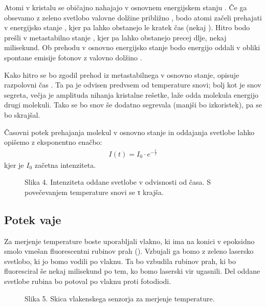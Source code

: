\documentclass[letterpaper,10pt,english]{sphinxmanual}
\begin{document}
\sphinxAtStartPar
Atomi v kristalu se običajno nahajajo v osnovnem energijskem stanju . Če ga obsevamo z zeleno svetlobo valovne dolžine približno , bodo atomi začeli prehajati v energijsko stanje , kjer pa lahko obstanejo le kratek čas (nekaj ). Hitro bodo prešli v metastabilno stanje , kjer pa lahko obstanejo precej dlje, nekaj milisekund. Ob prehodu v osnovno energijsko stanje  bodo energijo oddali v obliki spontane emisije \textendash{} fotonov z valovno dolžino .

\sphinxAtStartPar
Kako hitro se bo zgodil prehod iz metastabilnega v osnovno stanje, opisuje razpolovni čas . Ta pa je odvisen predvsem od temperature snovi; bolj kot je snov segreta, večja je amplituda nihanja kristalne rešetke, laže odda molekula energijo drugi molekuli. Tako se bo snov še dodatno segrevala (manjši bo izkoristek),  pa se bo skrajšal.

\sphinxAtStartPar
Časovni potek prehajanja molekul v osnovno stanje in oddajanja svetlobe lahko opišemo z eksponentno enačbo:
\begin{equation*}
\begin{split}I(t) = I_{0} \cdot  e ^ {- \frac{t}{τ}}\end{split}
\end{equation*}
\sphinxAtStartPar
kjer je \({I_{0}}\) začetna intenziteta.

\begin{figure}[htbp]
\centering
\capstart

\noindent{}
\caption{Slika 4. Intenziteta oddane svetlobe v odvisnosti od časa. S povečevanjem temperature snovi se τ krajša.}\label{\detokenize{vlakenski_senzorji:id5}}\end{figure}


\subsection{Potek vaje}
\label{\detokenize{vlakenski_senzorji:potek-vaje}}
\sphinxAtStartPar
Za merjenje temperature boste uporabljali vlakno, ki ima na konici v epoksidno smolo vmešan fluorescentni rubinov prah (). Vzbujali ga bomo z zeleno lasersko svetlobo, ki jo bomo vodili po vlaknu. Ta bo vzbudila rubinov prah, ki bo fluoresciral še nekaj milisekund po tem, ko bomo laserski vir ugasnili. Del oddane svetlobe rubina bo potoval po vlaknu proti fotodiodi.

\begin{figure}[htbp]
\centering
\capstart

\noindent{}
\caption{Slika 5. Skica vlakenskega senzorja za merjenje temperature.}\label{\detokenize{vlakenski_senzorji:id6}}\end{figure}



\renewcommand{\indexname}{Index}
\printindex
\end{document}
